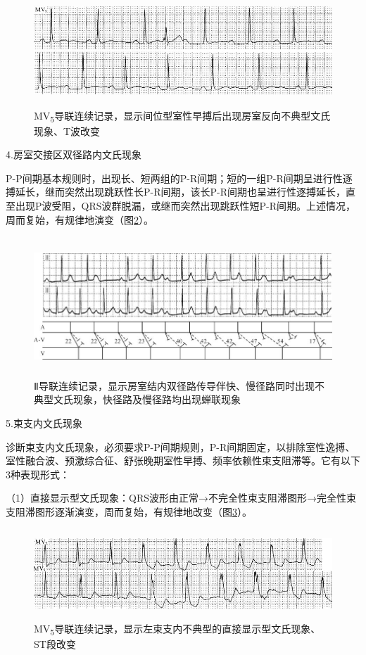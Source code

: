 \begin{figure}[!htbp]
 \centering
 \includegraphics[width=5.58333in,height=1.64583in]{./images/Image00306.jpg}
 \captionsetup{justification=centering}
 \caption{MV\textsubscript{5}导联连续记录，显示间位型室性早搏后出现房室反向不典型文氏现象、T波改变}
 \label{fig18-5}
  \end{figure} 


4.房室交接区双径路内文氏现象

P-P间期基本规则时，出现长、短两组的P-R间期；短的一组P-R间期呈进行性逐搏延长，继而突然出现跳跃性长P-R间期，该长P-R间期也呈进行性逐搏延长，直至出现P波受阻，QRS波群脱漏，或继而突然出现跳跃性短P-R间期。上述情况，周而复始，有规律地演变（图\ref{fig18-6}）。

\begin{figure}[!htbp]
 \centering
 \includegraphics[width=5.78125in,height=2.0625in]{./images/Image00307.jpg}
 \captionsetup{justification=centering}
 \caption{Ⅱ导联连续记录，显示房室结内双径路传导伴快、慢径路同时出现不典型文氏现象，快径路及慢径路均出现蝉联现象}
 \label{fig18-6}
  \end{figure} 

5.束支内文氏现象

诊断束支内文氏现象，必须要求P-P间期规则，P-R间期固定，以排除室性逸搏、室性融合波、预激综合征、舒张晚期室性早搏、频率依赖性束支阻滞等。它有以下3种表现形式：

（1）直接显示型文氏现象：QRS波形由正常→不完全性束支阻滞图形→完全性束支阻滞图形逐渐演变，周而复始，有规律地改变（图\ref{fig18-7}）。

\begin{figure}[!htbp]
 \centering
 \includegraphics[width=5.58333in,height=1.33333in]{./images/Image00308.jpg}
 \captionsetup{justification=centering}
 \caption{MV\textsubscript{5}导联连续记录，显示左束支内不典型的直接显示型文氏现象、ST段改变}
 \label{fig18-7}
  \end{figure} 



